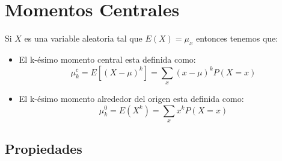 \documentclass[12pt, fleqn]{report}                             %
\theoremstyle{break}                                            %
\newcommand{\Wrap}[1]           {\left( #1 \right)}             %
\newcommand{\Brackets}[1]       {\left[ #1 \right]}             %
\begin{document}
        \clearpage
        \section{Momentos Centrales}

            Si $X$ es una variable aleatoria tal que $E(X) = \mu_x$ entonces tenemos que:
            \begin{itemize}
                \item 
                    El k-ésimo momento central esta definida como:
                    \begin{equation}
                        \mu_k^c 
                            = E\Brackets{(X - \mu)^k}
                            = \sum_x (x - \mu)^k P(X = x)
                    \end{equation}

                \item 
                    El k-ésimo momento alrededor del origen esta definida como:
                    \begin{equation}
                        \mu_k^0 
                            = E\Wrap{X^k}
                            = \sum_x x^k P(X = x)
                    \end{equation}

            \end{itemize}



            \subsection{Propiedades}
\end{document}
